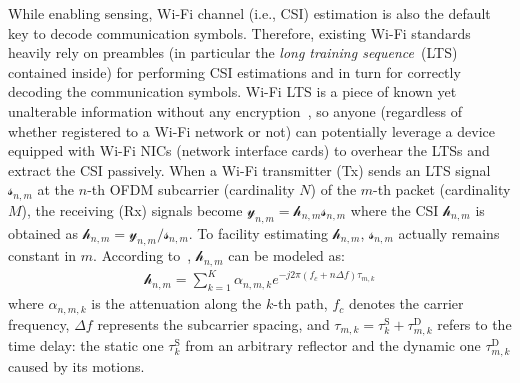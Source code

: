 \documentclass[conference,compsoc]{IEEEtran}
\newcommand{\newrev}[1]{{\color{blue}#1}}    %
\newcommand{\newrev}[1]{#1}
\begin{document}
While enabling sensing, Wi-Fi channel (i.e., CSI) estimation is also the default key to decode communication symbols. Therefore, existing Wi-Fi standards heavily rely on preambles (in particular the \textit{long training sequence}~(LTS)~\cite{biswaschannel} contained inside) for performing CSI estimations and in turn for correctly decoding the communication symbols. Wi-Fi LTS is a piece of \newrev{known yet unalterable information} without any encryption~\cite{yangdeath}, so anyone (regardless of whether registered to a Wi-Fi network or not) can potentially leverage a device equipped with Wi-Fi NICs (network interface cards) to overhear the LTSs and extract the CSI passively. 
When a Wi-Fi transmitter (Tx) sends an LTS signal $\mathcal{s}_{n,m}$ 
at the $n$-th OFDM subcarrier (cardinality $N$) of the $m$-th packet (cardinality $M$), the receiving (Rx) signals become $\mathcal{y}_{n,m} = \mathcal{h}_{n,m} \mathcal{s}_{n,m} $ where the CSI $\mathcal{h}_{n,m}$
is obtained as
$\mathcal{h}_{n,m} = \mathcal{y}_{n,m} / \mathcal{s}_{n,m}$. 
\newrev{To facility estimating $\mathcal{h}_{n,m}$, $\mathcal{s}_{n,m}$ actually remains constant in $m$.}
According to~\cite{MaZW19}, $\mathcal{h}_{n,m}$ can be modeled as:
%
\begin{align} \label{eq:csi_subc}
    \mathcal{h}_{n,m} = \textstyle{\sum_{k = 1}^{K}} \alpha_{n,m,k} e^{-j 2 \pi (f_c + n \Delta f ) \tau_{m,k}  } 
\end{align}
%
where $\alpha_{n,m,k}$ is the attenuation along the $k$-th path,  $f_c$ denotes the carrier frequency, $\Delta f$ represents the subcarrier spacing, and $\tau_{m,k} = \tau_k^{\mathrm{S}} + \tau_{m,k}^{\mathrm{D}}$ refers to the time delay: the static one $\tau_k^{\mathrm{S}}$ from an arbitrary reflector and the dynamic one $\tau_{m,k}^{\mathrm{D}}$ caused by its motions. 
\end{document}
